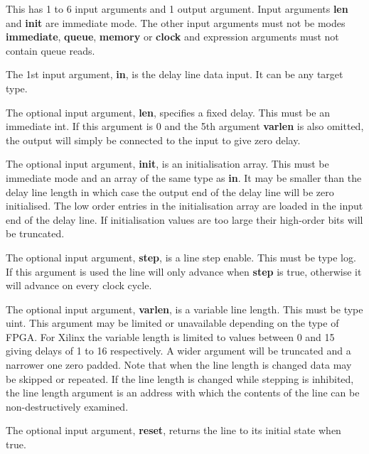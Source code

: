             This has 1 to 6 input arguments and 1 output argument. Input
            arguments {\bf len} and {\bf init} are immediate mode. The other
            input arguments must not be modes {\bf immediate}, {\bf queue}, {\bf
            memory} or {\bf clock} and expression arguments must not contain
            queue reads.

            The 1st input argument, {\bf in}, is the delay line data input. It
            can be any target type.

            The optional input argument, {\bf len}, specifies a fixed delay.
            This must be an immediate int. If this argument is 0 and
            the 5th argument {\bf varlen} is also omitted, the output will
            simply be connected to the input to give zero delay.

            The optional input argument, {\bf init}, is an initialisation
            array. This  must be immediate mode and an array of the same type as
            {\bf in}. It may be smaller than the delay line length in which case
            the output end of the delay line will be zero initialised. The low
            order entries in the initialisation array are loaded in the input
            end of the delay line. If initialisation values are too large their
            high-order bits will be truncated.

            The optional input argument, {\bf step}, is a line step enable.
            This  must be type log. If this argument is used the line will only
            advance when {\bf step} is true, otherwise it will advance on every
            clock cycle.

            The optional input argument, {\bf varlen}, is a variable line
            length. This must be type uint. This argument may be limited or
            unavailable depending on the type of FPGA. For Xilinx the variable
            length is limited to values between 0 and 15 giving delays of 1 to
            16 respectively. A wider argument will be truncated and a narrower
            one zero padded. Note that when the line length is changed data may
            be skipped or repeated. If the line length is changed while stepping
            is inhibited, the line length argument is an address with which the
            contents of the line can be non-destructively examined.

            The optional input argument, {\bf reset}, returns the
            line to its initial state when true.

